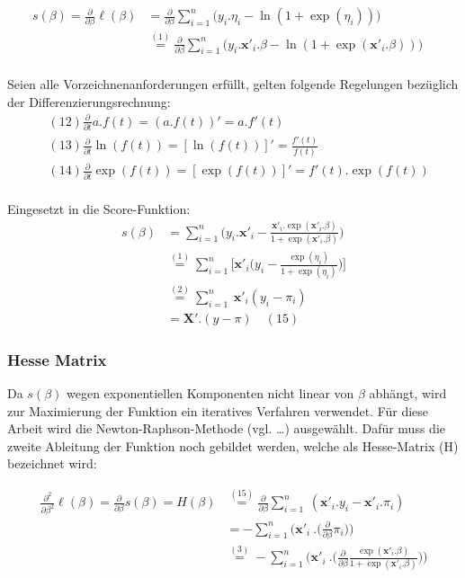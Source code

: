 \documentclass[12pt,]{article}
\begin{document}
\[
\begin{aligned}
s(\beta) = \frac{\partial}{\partial \beta}  \ell(\beta) &= \frac{\partial}{\partial \beta} \sum_{i = 1}^{n} \Big( y_i.\eta_i - \ln (1 + \exp(\eta_i)) \Big) \quad \\
&\mathrel{\overset{(1)}{=}} \frac{\partial}{\partial \beta} \sum_{i = 1}^{n} \Big( y_i.\mathbf{x'}_i.\beta  - \ln (1 + \exp(\mathbf{x'}_i.\beta )) \Big) \quad \\ 
\end{aligned}
\]

Seien alle Vorzeichnenanforderungen erfüllt, gelten folgende Regelungen
bezüglich der Differenzierungsrechnung: \[
\begin{aligned}
&(12) \frac{\partial}{\partial t} a.f(t) = (a.f(t))' = a.f'(t) \\
&(13) \frac{\partial}{\partial t} \ln(f(t)) = [\ln(f(t))]' = \frac{f'(t)}{f(t)} \\ 
&(14) \frac{\partial}{\partial t} \exp(f(t)) = [\exp(f(t))]' = f'(t).\exp(f(t)) \\
\end{aligned}
\]

Eingesetzt in die Score-Funktion: \[
\begin{aligned}
s(\beta) &= \sum_{i = 1}^{n} \Bigg( y_i.\mathbf{x'}_i - \frac{\mathbf{x'}_i.\exp(\mathbf{x'}_i.\beta)}{1 + \exp(\mathbf{x'}_i.\beta)} \Bigg) \\
&\mathrel{\overset{(1)}{=}}\sum_{i = 1}^{n} \Bigg[ \mathbf{x'}_i \Bigg( y_i - \frac{\exp(\eta_i)}{1 + \exp(\eta_i)} \Bigg) \Bigg] \\
&\mathrel{\overset{(2)}{=}}  \sum_{i = 1}^{n} \ \mathbf{x'}_i ( y_i - \pi_i) \quad  \\
&= \mathbf{X}'.(y-\pi) \quad (15) 
\end{aligned}
\]

\subsubsection{Hesse Matrix}\label{hesse-matrix}

Da \(s(\beta)\) wegen exponentiellen Komponenten nicht linear von
\(\beta\) abhängt, wird zur Maximierung der Funktion ein iteratives
Verfahren verwendet. Für diese Arbeit wird die Newton-Raphson-Methode
(vgl. \ldots{}) ausgewählt. Dafür muss die zweite Ableitung der Funktion
noch gebildet werden, welche als Hesse-Matrix (H) bezeichnet wird:

\[
\begin{aligned}
\frac{\partial^2}{\partial \beta^2} \ell(\beta) = \frac{\partial}{\partial \beta} s(\beta) = H(\beta) &\mathrel{\overset{(15)}{=}} \frac{\partial}{\partial \beta} \sum_{i = 1}^{n} \ (\mathbf{x'}_i.y_i - \mathbf{x'}_i.\pi_i) \\
&= - \sum_{i = 1}^{n} \Bigg( \mathbf{x'}_i \ .  \Big(\frac{\partial}{\partial \beta} \pi_i \Big) \Bigg) \\
&\mathrel{\overset{(3)}{=}} - \sum_{i = 1}^{n} \Bigg( \mathbf{x'}_i \ .  \Big(\frac{\partial}{\partial \beta} \frac{\exp(\mathbf{x'}_i.\beta)}{1+\exp(\mathbf{x'}_i.\beta)} \Big) \Bigg) \\
\end{aligned}
\]
\end{document}
